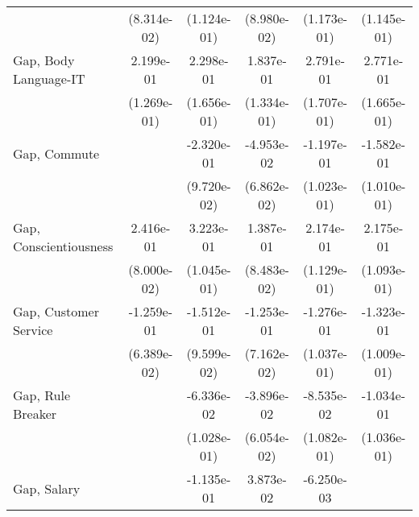 {\begin{tabular}{l*{5}{c}}
                             & (8.314e-02)                 & (1.124e-01)                 & (8.980e-02)                 & (1.173e-01)                 & (1.145e-01)                 \\
    \addlinespace
    Gap, Body Language-IT    & 2.199e-01\sym{+}            & 2.298e-01                   & 1.837e-01                   & 2.791e-01                   & 2.771e-01\sym{+}            \\
                             & (1.269e-01)                 & (1.656e-01)                 & (1.334e-01)                 & (1.707e-01)                 & (1.665e-01)                 \\
    \addlinespace
    Gap, Commute             &                             & -2.320e-01\sym{++}          & -4.953e-02                  & -1.197e-01                  & -1.582e-01                  \\
                             &                             & (9.720e-02)                 & (6.862e-02)                 & (1.023e-01)                 & (1.010e-01)                 \\
    \addlinespace
    Gap, Conscientiousness   & 2.416e-01\sym{*}            & 3.223e-01\sym{*}            & 1.387e-01                   & 2.174e-01\sym{+}            & 2.175e-01\sym{++}           \\
                             & (8.000e-02)                 & (1.045e-01)                 & (8.483e-02)                 & (1.129e-01)                 & (1.093e-01)                 \\
    \addlinespace
    Gap, Customer Service    & -1.259e-01\sym{+}           & -1.512e-01                  & -1.253e-01\sym{+}           & -1.276e-01                  & -1.323e-01                  \\
                             & (6.389e-02)                 & (9.599e-02)                 & (7.162e-02)                 & (1.037e-01)                 & (1.009e-01)                 \\
    \addlinespace
    Gap, Rule Breaker        &                             & -6.336e-02                  & -3.896e-02                  & -8.535e-02                  & -1.034e-01                  \\
                             &                             & (1.028e-01)                 & (6.054e-02)                 & (1.082e-01)                 & (1.036e-01)                 \\
    \addlinespace
    Gap, Salary              &                             & -1.135e-01                  & 3.873e-02                   & -6.250e-03                  &                             \\

\end{tabular}}
